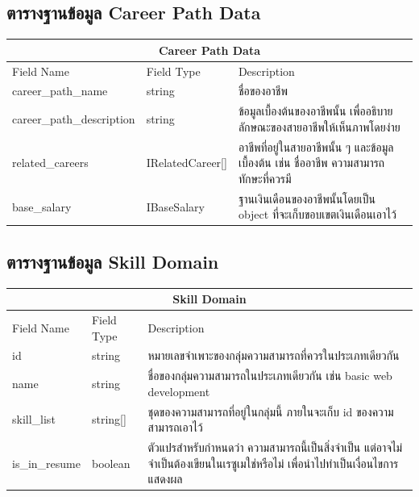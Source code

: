\subsection{ตารางฐานข้อมูล Career Path Data}
\begin{table}[H]
    \begin{tabularx}{\textwidth}{|l|l|X|}
        \hline
        \multicolumn{3}{|c|}{Career Path Data}                                                                      \\\hline
        Field Name  & Field Type     & Description                                                       \\\hline
        career\_path\_name             & string         & ชื่อของอาชีพ                                                      \\
        career\_path\_description      & string         & ข้อมูลเบื้องต้นของอาชีพนั้น เพื่ออธิบายลักษณะของสายอาชีพให้เห็นภาพโดยง่าย \\
        related\_careers              & IRelatedCareer{[}{]} &   อาชีพที่อยู่ในสายอาชีพนั้น ๆ และข้อมูลเบื้องต้น เช่น ชื่ออาชีพ ความสามารถ ทักษะที่ควรมี \\
        base\_salary                   & IBaseSalary & ฐานเงินเดือนของอาชีพนั้นโดยเป็น object ที่จะเก็บขอบเขตเงินเดือนเอาไว้ \\ \hline
    \end{tabularx}
\end{table}

\subsection{ตารางฐานข้อมูล Skill Domain}
\begin{table}[H]
    \begin{tabularx}{\textwidth}{|l|l|X|}
        \hline
        \multicolumn{3}{|c|}{Skill Domain}                              \\\hline
        Field Name    & Field Type & Description                  \\\hline
        id    & string     & หมายเลขจำเพาะของกลุ่มความสามารถที่ควรในประเภทเดียวกัน       \\
        name & string     & ชื่อของกลุ่มความสามารถในประเภทเดียวกัน เช่น basic web development \\
        skill\_list    & string[]     & ชุดของความสามารถที่อยู่ในกลุ่มนี้ ภายในจะเก็บ id ของความสามารถเอาไว้       \\
        is\_in\_resume & boolean     & ตัวแปรสำหรับกำหนดว่า ความสามารถนี้เป็นสิ่งจำเป็น แต่อาจไม่จำเป็นต้องเขียนในเรซูเมใช่หรือไม่ เพื่อนำไปทำเป็นเงื่อนไขการแสดงผล \\\hline
    \end{tabularx}
\end{table}

